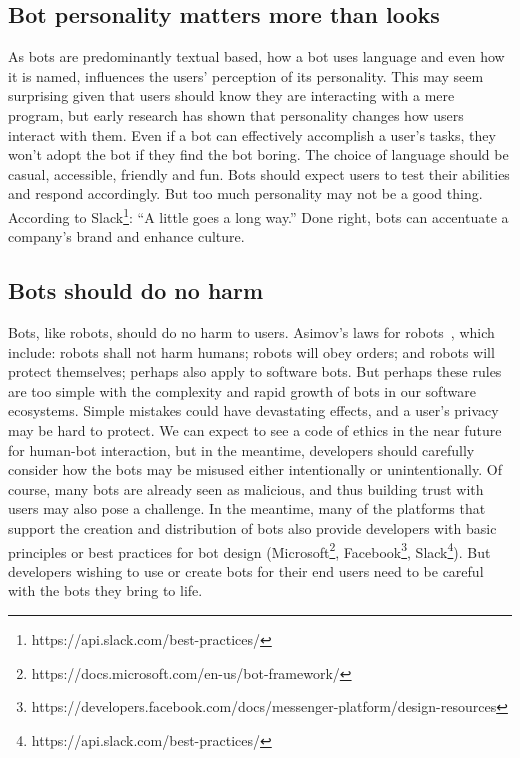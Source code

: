 \documentclass{sig-alternate}
\begin{document}
	\subsection{Bot personality matters more than looks} 
	As bots are predominantly textual based, how a bot uses language and even how it is named, influences the users' perception of its personality.  This may seem surprising given that users should know they are interacting with a mere program, but early research has shown that personality changes how users interact with them. 
	Even if a bot can effectively accomplish a user's tasks, they won't adopt the bot if they find the bot boring. The choice of language should be casual, accessible,  friendly and fun.  Bots should expect users to test their abilities and respond accordingly.
	But too much personality may not be a good thing.  According to Slack\footnote{https://api.slack.com/best-practices/}: ``A little goes a long way.''  Done right, bots can accentuate a company's brand and enhance culture.

\subsection{Bots should do no harm}


Bots, like robots, should do no harm to users.  
Asimov's laws for robots~\cite{asimov1950evitable}, which include: 
	robots shall not harm humans; robots will obey orders; and robots will protect themselves; perhaps also apply to software bots.
	But perhaps these rules are too simple with the complexity and rapid growth of bots in our software ecosystems.  Simple mistakes could have devastating effects, and a user's privacy may be hard to protect.  
	We can expect to see a code of ethics in the near future for human-bot interaction, but in the meantime, developers should carefully consider how the bots may be misused either intentionally or unintentionally. Of course, many bots are already seen as malicious, and thus building trust with users may also pose a challenge. 
	 In the meantime, many of the platforms that support the creation and distribution of bots also provide developers with basic principles or best practices for bot design (Microsoft\footnote{https://docs.microsoft.com/en-us/bot-framework/}, Facebook\footnote{https://developers.facebook.com/docs/messenger-platform/design-resources}, Slack\footnote{https://api.slack.com/best-practices/}).
	 But developers wishing to use or create bots for their end users need to be careful with the bots they bring to life. 
	
\end{document}
